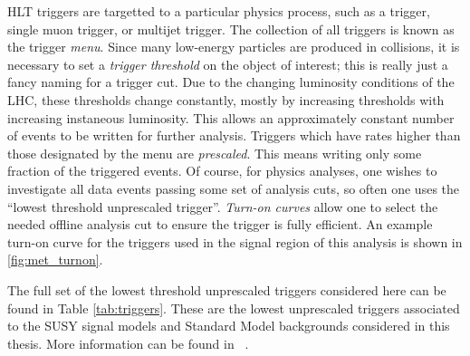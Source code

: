 HLT triggers are targetted to a particular physics process, such as a \met trigger, single muon trigger, or multijet trigger.
The collection of all triggers is known as the trigger \textit{menu}.
Since many low-energy particles are produced in collisions, it is necessary to set a \textit{trigger threshold} on the object of interest; this is really just a fancy naming for a trigger \pt cut.
Due to the changing luminosity conditions of the LHC, these thresholds change constantly, mostly by increasing thresholds with increasing instaneous luminosity.
This allows an approximately constant number of events to be written for further analysis.
Triggers which have rates higher than those designated by the menu are \textit{prescaled}.
This means writing only some fraction of the triggered events.
Of course, for physics analyses, one wishes to investigate all data events passing some set of analysis cuts, so often one uses the ``lowest threshold unprescaled trigger''.
\textit{Turn-on curves} allow one to select the needed offline analysis cut to ensure the trigger is fully efficient.
An example turn-on curve for the \met triggers used in the signal region of this analysis is shown in \ref{fig:met_turnon}.

The full set of the lowest threshold unprescaled triggers considered here can be found in Table \ref{tab:triggers}.
These are the lowest unprescaled triggers associated to the SUSY signal models and Standard Model backgrounds considered in this thesis.
More information can be found in ~\cite{ATL-DAQ-PUB-2016-001}.


